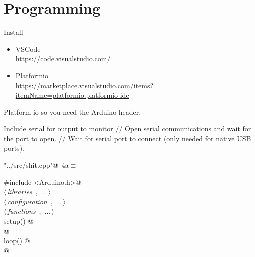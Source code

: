 \documentclass[a4paper, 12pt]{article}
\begin{document}
\section{Programming}

Install 

\begin{itemize}
  \item VSCode \\
  \url{https://code.visualstudio.com/}
  \item Platformio \\
  \url{https://marketplace.visualstudio.com/items?itemName=platformio.platformio-ide}
\end{itemize}

Platform io so you need the Arduino header.

Include serial for output to monitor
// Open serial communications and wait for the port to open.
// Wait for serial port to connect (only needed for native USB ports).

\begin{flushleft} \small
\begin{minipage}{\linewidth}\label{scrap1}\raggedright\small
{}\verb@"../src/shit.cpp"@\nobreak\ {\footnotesize{4a}}$\equiv$
\vspace{-1ex}
\begin{list}{}{\setlength{\leftmargin}{1em}} \item
\mbox{}\lstinline@#include <Arduino.h>@\\
\mbox{}\lstinline@@$\langle\,${\itshape libraries}\ {\footnotesize {}},\ ...\,$\rangle\,$\verb@@\\
\mbox{}\lstinline@@$\langle\,${\itshape configuration}\ {\footnotesize {}},\ ...\,$\rangle\,$\verb@@\\
\mbox{}\lstinline@@$\langle\,${\itshape functions}\ {\footnotesize {}},\ ...\,$\rangle\,$\verb@@\\
\mbox{}\lstinline@void setup() @\\
\mbox{}@\\
\mbox{}\lstinline@void loop() @\\
\mbox{}@\\
\mbox{}{\NWsep}
\end{list}
\vspace{-1ex}
\end{minipage}
\end{flushleft}
\end{document}
